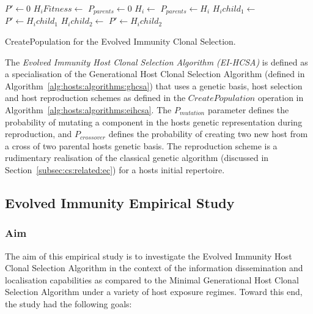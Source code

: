 \begin{algorithm}[htp]
  \SetLine
  
	
	$P\prime \leftarrow$0\;			
	{
		$H_iFitness \leftarrow $ \;
	}
	$P_{parents} \leftarrow$0\;
	{
		$H_i \leftarrow$ \BiasedRouletteWheelSelection{\Pop}\;
		$P_{parents} \leftarrow H_i$\;
	}		
	{
		$H_ichild_1 \leftarrow $ \;
		$P\prime \leftarrow H_ichild_1$\;
		$H_ichild_2 \leftarrow $ \;
		$P\prime \leftarrow H_ichild_2$\;
	}
	{
		\;
	}	
	\;
	\caption{CreatePopulation for the Evolved Immunity Clonal Selection.}
	\label{alg:hosts:algorithms:eihcsa}
\end{algorithm}

The \emph{Evolved Immunity Host Clonal Selection Algorithm (EI-HCSA)} is defined as a specialisation of the Generational Host Clonal Selection Algorithm (defined in Algorithm~\ref{alg:hosts:algorithms:ghcsa}) that uses a genetic basis, host selection and host reproduction schemes as defined in the $CreatePopulation$ operation in Algorithm~\ref{alg:hosts:algorithms:eihcsa}. The $P_{mutation}$ parameter defines the probability of mutating a component in the hosts genetic representation during reproduction, and $P_{crossover}$ defines the probability of creating two new host from a cross of two parental hosts genetic basis. The reproduction scheme is a rudimentary realisation of the classical genetic algorithm (discussed in Section~\ref{subsec:cs:related:ec}) for a hosts initial repertoire.

%
%
\subsection{Evolved Immunity Empirical Study}
\label{sec:hosts:generational:evolved:study}

%
%
\subsubsection{Aim}
The aim of this empirical study is to investigate the Evolved Immunity Host Clonal Selection Algorithm in the context of the information dissemination and localisation capabilities as compared to the Minimal Generational Host Clonal Selection Algorithm under a variety of host exposure regimes. Toward this end, the study had the following goals:

